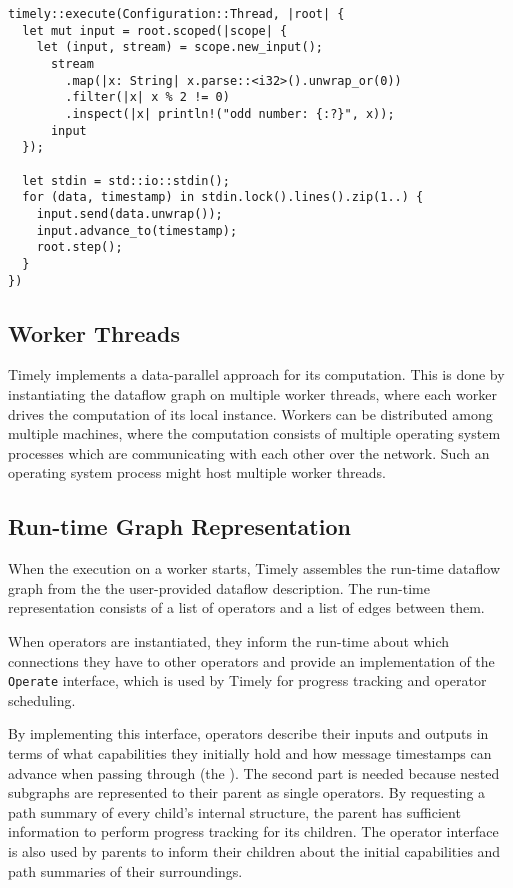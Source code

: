 \begin{lstlisting}[caption={[Example program in Timely Dataflow.]A trival 
single-threaded example program which reads lines from standard input,
converts them into integers and filters out odd numbers.}]
timely::execute(Configuration::Thread, |root| {
  let mut input = root.scoped(|scope| {
    let (input, stream) = scope.new_input();
      stream
        .map(|x: String| x.parse::<i32>().unwrap_or(0))
        .filter(|x| x % 2 != 0)
        .inspect(|x| println!("odd number: {:?}", x));
      input
  });

  let stdin = std::io::stdin();
  for (data, timestamp) in stdin.lock().lines().zip(1..) {
    input.send(data.unwrap());
    input.advance_to(timestamp);
    root.step();
  }
})
\end{lstlisting}

\subsection{Worker Threads}

Timely implements a data-parallel approach for its computation. This is done by
instantiating the dataflow graph on multiple worker threads, where each worker
drives the computation of its local instance. Workers can be distributed among multiple
machines, where the computation consists of multiple operating system processes
which are communicating with each other over the network. Such an
operating system process might host multiple worker threads.

\subsection{Run-time Graph Representation} \label{sec:runtime-graph}

When the execution on a worker starts, Timely assembles the run-time
dataflow graph from the the user-provided dataflow description. The run-time
representation consists of a list of operators and a list of edges between them.

When operators are instantiated, they inform the run-time about which
connections they have to other operators and provide an implementation
of the \lstinline{Operate} interface, which is used by Timely for progress
tracking and operator scheduling.

By implementing this interface, operators describe their inputs and
outputs in terms of what capabilities they initially hold and how message
timestamps can advance when passing through (the ).
The second part is needed because nested subgraphs are represented to their
parent as single operators. By requesting a path summary of every child's
internal structure, the parent has sufficient information to perform progress
tracking for its children. The operator interface is also used by parents
to inform their children about the initial capabilities and path summaries
of their surroundings.

